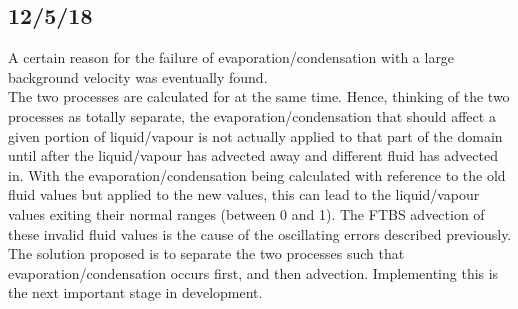 \documentclass[11pt]{article}
\begin{document}
\subsection{12/5/18}
A certain reason for the failure of evaporation/condensation with a large background velocity was eventually found.\\
The two processes are calculated for at the same time. Hence, thinking of the two processes as totally separate, the evaporation/condensation that should affect a given portion of liquid/vapour is not actually applied to that part of the domain until after the liquid/vapour has advected away and different fluid has advected in. With the evaporation/condensation being calculated with reference to the old fluid values but applied to the new values, this can lead to the liquid/vapour values exiting their normal ranges (between 0 and 1). The FTBS advection of these invalid fluid values is the cause of the oscillating errors described previously.\\
The solution proposed is to separate the two processes such that evaporation/condensation occurs first, and then advection. Implementing this is the next important stage in development.
\end{document}
